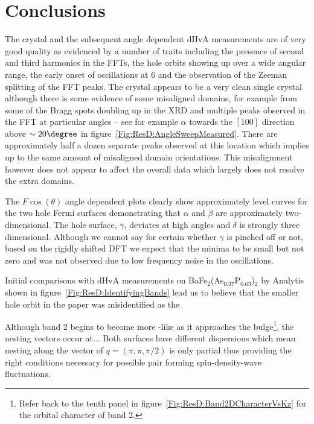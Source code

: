 
\section{Conclusions}

The \BaFeP crystal and the subsequent angle dependent \ac{dHvA} measurements are of very good quality as evidenced by a number of traits including the presence of second and third harmonics in the \acp{FFT}, the hole orbits showing up over a wide angular range, the early onset of oscillations at \unit{6}{\tesla} and the observation of the Zeeman splitting of the \ac{FFT} peaks. The crystal appears to be a very clean single crystal although there is some evidence of some misaligned domains, for example from some of the Bragg spots doubling up in the \ac{XRD} and multiple peaks observed in the \ac{FFT} at particular angles -- see for example $\alpha$ towards the $[100]$ direction above $\sim 20\degree$ in figure~\ref{Fig:ResD:AngleSweepMeasured}. There are approximately half a dozen separate peaks observed at this location which implies up to the same amount of misaligned domain orientations. This misalignment however does not appear to affect the overall data which largely does not resolve the extra domains.

The $F\cos(\theta)$ angle dependent plots clearly show approximately level curves for the two hole Fermi surfaces demonstrating that $\alpha$ and $\beta$ are approximately two-dimensional. The hole surface, $\gamma$, deviates at high angles and $\delta$ is strongly three dimensional. Although we cannot say for certain whether $\gamma$ is pinched off or not, based on the rigidly shifted \ac{DFT} we expect that the minima to be small but not zero and was not observed due to low frequency noise in the oscillations.

Initial comparisons with \ac{dHvA} measurements on BaFe$_2$(As$_{0.37}$P$_{0.63}$)$_2$ by Analytis \etal shown in figure~\ref{Fig:ResD:IdentifyingBands} lead us to believe that the smaller hole orbit in the paper was misidentified as the

Although band 2 begins to become more \DzTwo-like as it approaches the bulge\footnote{Refer back to the tenth panel in figure~\ref{Fig:ResD:Band2DCharacterVsKz} for the orbital character of band 2.}, the nesting vectors occur at...
Both surfaces have different \kz dispersions which mean nesting along the vector of $q=(\pi, \pi, \pi/2)$ is only partial thus providing the right conditions necessary for possible pair forming spin-density-wave fluctuations. 


